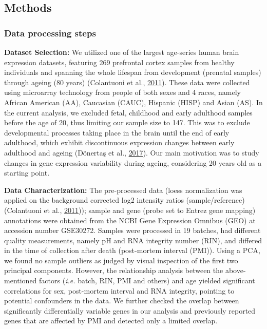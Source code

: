 \documentclass[12pt,twoside]{unicam}
\begin{document}
\hypertarget{veronikaMethods}{%
\subsection{Methods}\label{veronikaMethods}}

\hypertarget{data-processing-steps}{%
\subsubsection{Data processing steps}\label{data-processing-steps}}

\textbf{Dataset Selection:} We utilized one of the largest age-series human brain expression datasets, featuring 269 prefrontal cortex samples from healthy individuals and spanning the whole lifespan from development (prenatal samples) through ageing (80 years) (Colantuoni et al., \protect\hyperlink{ref-Colantuoni2011}{2011}). These data were collected using microarray technology from people of both sexes and 4 races, namely African American (AA), Caucasian (CAUC), Hispanic (HISP) and Asian (AS). In the current analysis, we excluded fetal, childhood and early adulthood samples before the age of 20, thus limiting our sample size to 147. This was to exclude developmental processes taking place in the brain until the end of early adulthood, which exhibit discontinuous expression changes between early adulthood and ageing (Dönertaş et al., \protect\hyperlink{ref-Donertas2017}{2017}). Our main motivation was to study changes in gene expression variability during ageing, considering 20 years old as a starting point.

\textbf{Data Characterization:} The pre-processed data (loess normalization was applied on the background corrected log2 intensity ratios (sample/reference)(Colantuoni et al., \protect\hyperlink{ref-Colantuoni2011}{2011})); sample and gene (probe set to Entrez gene mapping) annotations were obtained from the NCBI Gene Expression Omnibus (GEO) at accession number GSE30272. Samples were processed in 19 batches, had different quality measurements, namely pH and RNA integrity number (RIN), and differed in the time of collection after death (post-mortem interval (PMI)). Using a PCA, we found no sample outliers as judged by visual inspection of the first two principal components. However, the relationship analysis between the above-mentioned factors (\emph{i.e.} batch, RIN, PMI and others) and age yielded significant correlations for sex, post-mortem interval and RNA integrity, pointing to potential confounders in the data. We further checked the overlap between significantly differentially variable genes in our analysis and previously reported genes that are affected by PMI and detected only a limited overlap.
\end{document}
